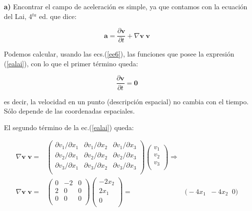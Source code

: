 \documentclass[10pt,a4paper]{article}
\theoremstyle{definition}
\begin{document}
\textbf{a)} Encontrar el campo de aceleración es simple, ya que contamos con la ecuación del Lai, 4$^{ta}$ ed. que dice:


\begin{equation}\label{ealai}
\mathbf{a} = \dfrac{\partial \mathbf{v}}{\partial t} + \nabla \mathbf{v} \; \mathbf{v}
\end{equation}

Podemos calcular, usando las ecs.(\ref{ee6}), las funciones que posee la expresión (\ref{ealai}), con lo que el primer término queda:

\begin{equation}
\dfrac{\partial \mathbf{v}}{\partial t} = \mathbf{0}
\end{equation}

\noindent es decir, la velocidad en un punto (descripción espacial) no cambia con el tiempo. Sólo depende de las coordenadas espaciales.

El segundo término de la ec.(\ref{ealai}) queda:

\begin{eqnarray}
\nonumber
\nabla \mathbf{v} \; \mathbf{v}  = &    
\begin{pmatrix}
\partial v_1 / \partial x_1 &  \partial v_1 / \partial x_2 & \partial v_1 / \partial x_3\\ 
\partial v_2 / \partial x_1 &  \partial v_2 / \partial x_2 & \partial v_2 / \partial x_3\\ 
\partial v_3 / \partial x_1 &  \partial v_3 / \partial x_2 & \partial v_3 / \partial x_3\\ 
\end{pmatrix}
\begin{pmatrix}
v_1 \\
v_2 \\
v_3 \\
\end{pmatrix}
\Rightarrow & \\ 
\nabla \mathbf{v} \; \mathbf{v}  = &  
\begin{pmatrix}
0 &  -2 & 0 \\ 
2 &  0 & 0 \\ 
0 &  0 & 0 \\ 
\end{pmatrix}
\begin{pmatrix}
-2 x_2 \\
2 x_1 \\
0 \\
\end{pmatrix}
= & 
\Big( -4x_1 \; \; -4x_2 \; \; 0 \Big)
\end{eqnarray}
\end{document}
